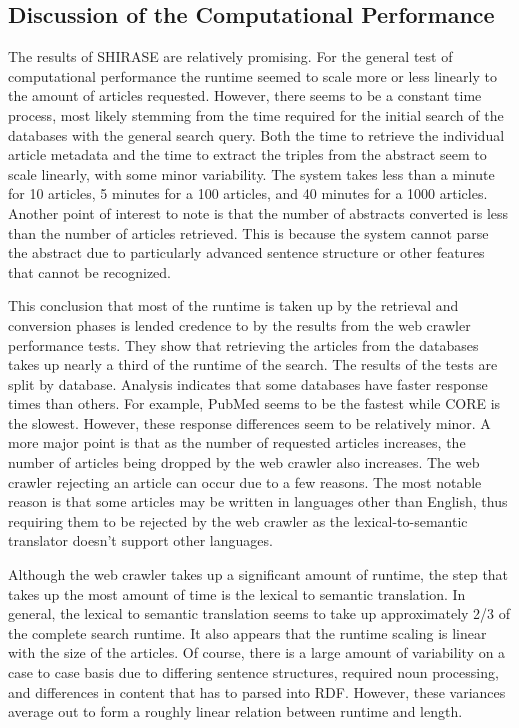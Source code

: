 \documentclass[12pt]{article}
\begin{document}
	\subsection{Discussion of the Computational Performance}
    \quad The results of SHIRASE are relatively promising. For the general test of computational performance the runtime seemed to scale more or less linearly to the amount of articles requested. However, there seems to be a constant time process, most likely stemming from the time required for the initial search of the databases with the general search query. Both the time to retrieve the individual article metadata and the time to extract the triples from the abstract seem to scale linearly, with some minor variability. The system takes less than a minute for 10 articles, 5 minutes for a 100 articles, and 40 minutes for a 1000 articles. Another point of interest to note is that the number of abstracts converted is less than the number of articles retrieved. This is because the system cannot parse the abstract due to particularly advanced sentence structure or other features that cannot be recognized.  
    
    This conclusion that most of the runtime is taken up by the retrieval and conversion phases is lended credence to by the results from the web crawler performance tests. They show that retrieving the articles from the databases takes up nearly a third of the runtime of the search. The results of the tests are split by database. Analysis indicates that some databases have faster response times than others. For example, PubMed seems to be the fastest while CORE is the slowest. However, these response differences seem to be relatively minor. A more major point is that as the number of requested articles increases, the number of articles being dropped by the web crawler also increases. The web crawler rejecting an article can occur due to a few reasons. The most notable reason is that some articles may be written in languages other than English, thus requiring them to be rejected by the web crawler as the lexical-to-semantic translator doesn't support other languages.
    
    Although the web crawler takes up a significant amount of runtime, the step that takes up the most amount of time is the lexical to semantic translation. In general, the lexical to semantic translation seems to take up approximately 2/3 of the complete search runtime. It also appears that the runtime scaling is linear with the size of the articles. Of course, there is a large amount of variability on a case to case basis due to differing sentence structures, required noun processing, and differences in content that has to parsed into RDF. However, these variances average out to form a roughly linear relation between runtime and length. 
   
\end{document}
